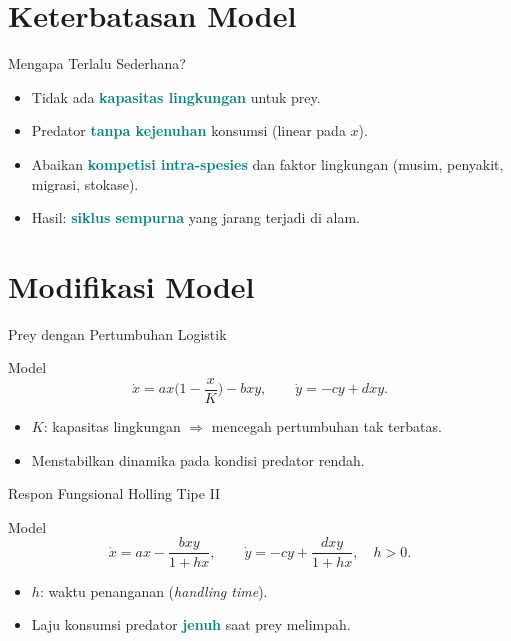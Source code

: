\documentclass[aspectratio=32]{beamer}
\newcommand{\jsg}[1]{\textcolor{teal}{\textbf{#1}}}
\begin{document}
\section{Keterbatasan Model}

\begin{frame}{Mengapa Terlalu Sederhana?}
  \begin{itemize}
    \item Tidak ada \jsg{kapasitas lingkungan} untuk prey.
    \item Predator \jsg{tanpa kejenuhan} konsumsi (linear pada \(x\)).
    \item Abaikan \jsg{kompetisi intra-spesies} dan faktor lingkungan (musim, penyakit, migrasi, stokase).
    \item Hasil: \jsg{siklus sempurna} yang jarang terjadi di alam.
  \end{itemize}
\end{frame}

\section{Modifikasi Model}

\begin{frame}{Prey dengan Pertumbuhan Logistik}
  \begin{block}{Model}
  \[
  \dot{x}= ax\Big(1-\frac{x}{K}\Big) - bxy,\qquad
  \dot{y}= -cy + dxy.
  \]
  \end{block}
  \begin{itemize}
    \item \(K\): kapasitas lingkungan \(\Rightarrow\) mencegah pertumbuhan tak terbatas.
    \item Menstabilkan dinamika pada kondisi predator rendah.
  \end{itemize}
\end{frame}

\begin{frame}{Respon Fungsional Holling Tipe II}
  \begin{block}{Model}
  \[
  \dot{x}= ax - \frac{bxy}{1+h x},\qquad
  \dot{y}= -cy + \frac{dxy}{1+h x},\quad h>0.
  \]
  \end{block}
  \begin{itemize}
    \item \(h\): waktu penanganan (\textit{handling time}).
    \item Laju konsumsi predator \jsg{jenuh} saat prey melimpah.
  \end{itemize}
\end{frame}
\end{document}
